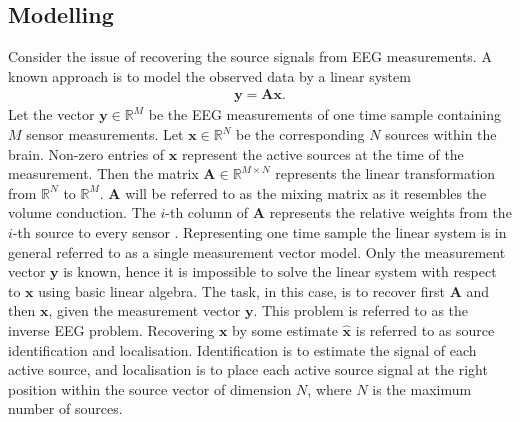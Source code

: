%     


\subsection{Modelling}
Consider the issue of recovering the source signals from EEG measurements. A known approach is to model the observed data by a linear system 
\begin{align*}
\mathbf{y} = \mathbf{Ax}.
\end{align*}
Let the vector $\mathbf{y} \in \mathbb{R}^{M}$ be the EEG measurements of one time sample containing $M$ sensor measurements. Let $\mathbf{x} \in \mathbb{R}^{N}$ be the corresponding $N$ sources within the brain. 
Non-zero entries of $\textbf{x}$ represent the active sources at the time of the measurement. 
Then the matrix $\mathbf{A} \in \mathbb{R}^{M \times N}$ represents the linear transformation from $\mathbb{R}^{N}$ to $\mathbb{R}^{M}$. $\mathbf{A}$ will be referred to as the mixing matrix as it resembles the volume conduction. 
The $i$-th column of $\mathbf{A}$ represents the relative weights from the $i$-th source to every sensor \cite{phd2015}. 
Representing one time sample the linear system is in general referred to as a single measurement vector model. 
Only the measurement vector $\textbf{y}$ is known, hence it is impossible to solve the linear system with respect to $\textbf{x}$ using basic linear algebra. 
The task, in this case, is to recover first $\mathbf{A}$ and then $\mathbf{x}$, given the measurement vector $\mathbf{y}$. This problem is referred to as the inverse EEG problem. 
Recovering $\textbf{x}$ by some estimate $\hat{\textbf{x}}$ is referred to as source identification and localisation. Identification is to estimate the signal of each active source, and localisation is to place each active source signal at the right position within the source vector of dimension $N$, where $N$ is the maximum number of sources.      

